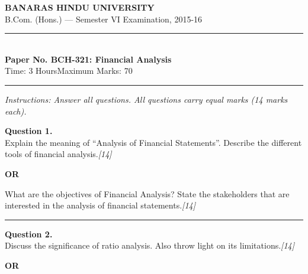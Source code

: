 \documentclass[11pt,a4paper]{article}
\newcommand{\pts}[1]{\hfill   \textit{[#1]}}
\begin{document}
\begin{center}
  {\large\bfseries BANARAS HINDU UNIVERSITY}\\[2pt]
  {\normalsize B.Com. (Hons.) --- Semester VI Examination, 2015-16}\\[6pt]
  \rule{0.8\linewidth}{0.5pt}\\[6pt]
  {\large\bfseries Paper No. BCH-321: Financial Analysis}\\[4pt]
  {\normalsize Time: 3 Hours\hfill Maximum Marks: 70}
\end{center}

\rule{\linewidth}{0.4pt}

\smallskip



\noindent   \textit{Instructions: Answer all questions. All questions carry equal marks (14 marks each).}

\bigskip




\noindent   \textbf{Question 1.} \\
Explain the meaning of ``Analysis of Financial Statements''. Describe the different tools of financial analysis.\pts{14}

\centerline{   \textbf{OR}}

What are the objectives of Financial Analysis? State the stakeholders that are interested in the analysis of financial statements.\pts{14}

\medskip\rule{\linewidth}{0.2pt}




\noindent   \textbf{Question 2.} \\
Discuss the significance of ratio analysis. Also throw light on its limitations.\pts{14}

\centerline{   \textbf{OR}}
\end{document}

